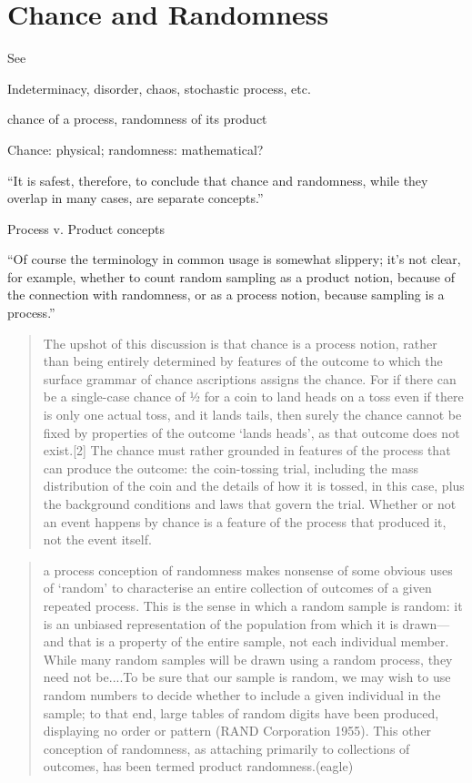 \documentclass[reqno,12pt]{tufte-book}
\numberwithin{equation}{subsection}
\begin{document}
\section{Chance and Randomness}

See \cite{eagle_chance_2014}

Indeterminacy, disorder, chaos, stochastic process, etc.

chance of a process, randomness of its product

Chance: physical; randomness: mathematical?

``It is safest, therefore, to conclude that chance and randomness, while they overlap in many cases, are separate concepts.''\cite{eagle_chance_2014}

Process v. Product concepts

``Of course the terminology in common usage is somewhat slippery; it's not clear, for example, whether to count random sampling as a product notion, because of the connection with randomness, or as a process notion, because sampling is a process.''

\blockquote{The upshot of this discussion is that chance is a process notion, rather than being entirely determined by features of the outcome to which the surface grammar of chance ascriptions assigns the chance. For if there can be a single-case chance of ½ for a coin to land heads on a toss even if there is only one actual toss, and it lands tails, then surely the chance cannot be fixed by properties of the outcome ‘lands heads’, as that outcome does not exist.[2] The chance must rather grounded in features of the process that can produce the outcome: the coin-tossing trial, including the mass distribution of the coin and the details of how it is tossed, in this case, plus the background conditions and laws that govern the trial. Whether or not an event happens by chance is a feature of the process that produced it, not the event itself.\cite{eagle_chance_2014}}

\blockquote{a process conception of randomness makes nonsense of some obvious uses of ‘random’ to characterise an entire collection of outcomes of a given repeated process. This is the sense in which a random sample is random: it is an unbiased representation of the population from which it is drawn—and that is a property of the entire sample, not each individual member. While many random samples will be drawn using a random process, they need not be....To be sure that our sample is random, we may wish to use random numbers to decide whether to include a given individual in the sample; to that end, large tables of random digits have been produced, displaying no order or pattern (RAND Corporation 1955). This other conception of randomness, as attaching primarily to collections of outcomes, has been termed product randomness.(eagle)}
\end{document}
